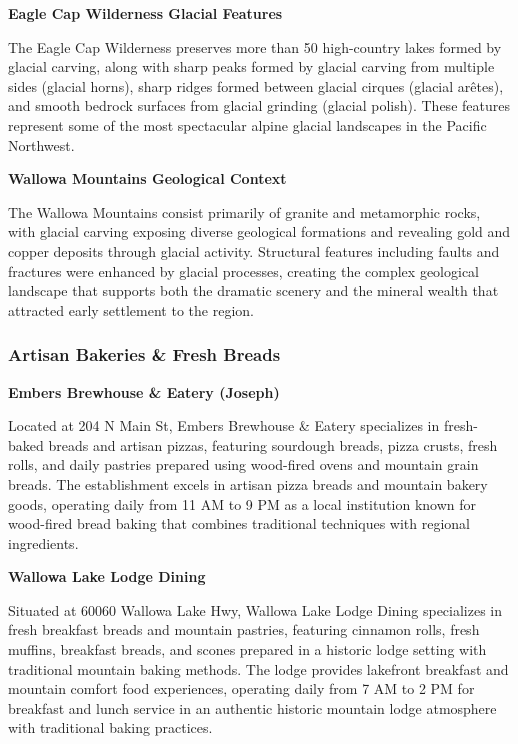 \documentclass[
  11pt,
  letterpaper,
  DIV=10,
  numbers=noendperiod]{scrartcl}
\begin{document}
\textbf{Eagle Cap Wilderness Glacial Features}

The Eagle Cap Wilderness preserves more than 50 high-country lakes
formed by glacial carving, along with sharp peaks formed by glacial
carving from multiple sides (glacial horns), sharp ridges formed between
glacial cirques (glacial arêtes), and smooth bedrock surfaces from
glacial grinding (glacial polish). These features represent some of the
most spectacular alpine glacial landscapes in the Pacific Northwest.

\textbf{Wallowa Mountains Geological Context}

The Wallowa Mountains consist primarily of granite and metamorphic
rocks, with glacial carving exposing diverse geological formations and
revealing gold and copper deposits through glacial activity. Structural
features including faults and fractures were enhanced by glacial
processes, creating the complex geological landscape that supports both
the dramatic scenery and the mineral wealth that attracted early
settlement to the region.

\subsubsection{Artisan Bakeries \& Fresh
Breads}\label{artisan-bakeries-fresh-breads-2}

\textbf{Embers Brewhouse \& Eatery (Joseph)}

Located at 204 N Main St, Embers Brewhouse \& Eatery specializes in
fresh-baked breads and artisan pizzas, featuring sourdough breads, pizza
crusts, fresh rolls, and daily pastries prepared using wood-fired ovens
and mountain grain breads. The establishment excels in artisan pizza
breads and mountain bakery goods, operating daily from 11 AM to 9 PM as
a local institution known for wood-fired bread baking that combines
traditional techniques with regional ingredients.

\textbf{Wallowa Lake Lodge Dining}

Situated at 60060 Wallowa Lake Hwy, Wallowa Lake Lodge Dining
specializes in fresh breakfast breads and mountain pastries, featuring
cinnamon rolls, fresh muffins, breakfast breads, and scones prepared in
a historic lodge setting with traditional mountain baking methods. The
lodge provides lakefront breakfast and mountain comfort food
experiences, operating daily from 7 AM to 2 PM for breakfast and lunch
service in an authentic historic mountain lodge atmosphere with
traditional baking practices.
\end{document}
